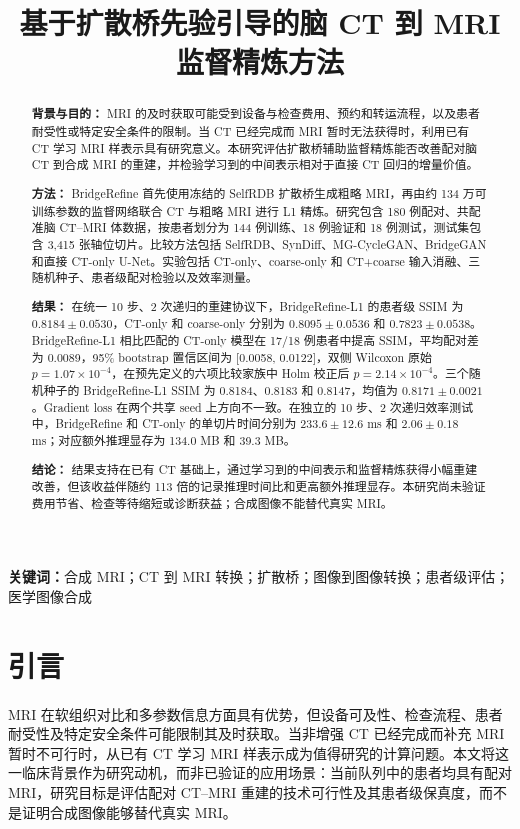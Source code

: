 \documentclass[UTF8,11pt,a4paper]{ctexart}
\title{基于扩散桥先验引导的脑 CT 到 MRI 监督精炼方法}
\author{}
\date{}
\begin{document}
\maketitle

\begin{abstract}
\textbf{背景与目的：} MRI 的及时获取可能受到设备与检查费用、预约和转运流程，以及患者耐受性或特定安全条件的限制。当 CT 已经完成而 MRI 暂时无法获得时，利用已有 CT 学习 MRI 样表示具有研究意义。本研究评估扩散桥辅助监督精炼能否改善配对脑 CT 到合成 MRI 的重建，并检验学习到的中间表示相对于直接 CT 回归的增量价值。

\textbf{方法：} BridgeRefine 首先使用冻结的 SelfRDB 扩散桥生成粗略 MRI，再由约 134 万可训练参数的监督网络联合 CT 与粗略 MRI 进行 L1 精炼。研究包含 180 例配对、共配准脑 CT--MRI 体数据，按患者划分为 144 例训练、18 例验证和 18 例测试，测试集包含 3,415 张轴位切片。比较方法包括 SelfRDB、SynDiff、MG-CycleGAN、BridgeGAN 和直接 CT-only U-Net。实验包括 CT-only、coarse-only 和 CT+coarse 输入消融、三随机种子、患者级配对检验以及效率测量。

\textbf{结果：} 在统一 10 步、2 次递归的重建协议下，BridgeRefine-L1 的患者级 SSIM 为 $0.8184\pm0.0530$，CT-only 和 coarse-only 分别为 $0.8095\pm0.0536$ 和 $0.7823\pm0.0538$。BridgeRefine-L1 相比匹配的 CT-only 模型在 17/18 例患者中提高 SSIM，平均配对差为 0.0089，95\% bootstrap 置信区间为 [0.0058, 0.0122]，双侧 Wilcoxon 原始 $p=1.07\times10^{-4}$，在预先定义的六项比较家族中 Holm 校正后 $p=2.14\times10^{-4}$。三个随机种子的 BridgeRefine-L1 SSIM 为 0.8184、0.8183 和 0.8147，均值为 $0.8171\pm0.0021$。Gradient loss 在两个共享 seed 上方向不一致。在独立的 10 步、2 次递归效率测试中，BridgeRefine 和 CT-only 的单切片时间分别为 $233.6\pm12.6$ ms 和 $2.06\pm0.18$ ms；对应额外推理显存为 134.0 MB 和 39.3 MB。

\textbf{结论：} 结果支持在已有 CT 基础上，通过学习到的中间表示和监督精炼获得小幅重建改善，但该收益伴随约 113 倍的记录推理时间比和更高额外推理显存。本研究尚未验证费用节省、检查等待缩短或诊断获益；合成图像不能替代真实 MRI。
\end{abstract}

\noindent\textbf{关键词：}合成 MRI；CT 到 MRI 转换；扩散桥；图像到图像转换；患者级评估；医学图像合成

\section{引言}
\paragraph{}MRI 在软组织对比和多参数信息方面具有优势，但设备可及性、检查流程、患者耐受性及特定安全条件可能限制其及时获取。当非增强 CT 已经完成而补充 MRI 暂时不可行时，从已有 CT 学习 MRI 样表示成为值得研究的计算问题。本文将这一临床背景作为研究动机，而非已验证的应用场景：当前队列中的患者均具有配对 MRI，研究目标是评估配对 CT--MRI 重建的技术可行性及其患者级保真度，而不是证明合成图像能够替代真实 MRI。
\end{document}
